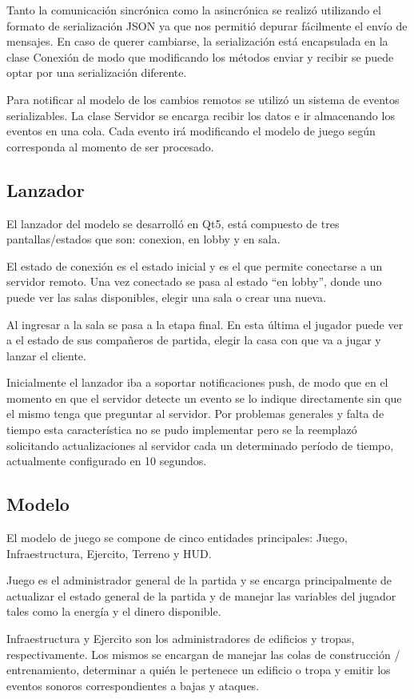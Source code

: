 \documentclass[titlepage,a4paper,12pt]{article}
\begin{document}
Tanto la comunicación sincrónica como la asincrónica se realizó utilizando el formato de serialización JSON ya que nos permitió depurar fácilmente el envío de mensajes. En caso de querer cambiarse, la serialización está encapsulada en la clase Conexión de modo que modificando los métodos enviar y recibir se puede optar por una serialización diferente.

Para notificar al modelo de los cambios remotos se utilizó un sistema de eventos serializables. La clase Servidor se encarga recibir los datos e ir almacenando los eventos en una cola. Cada evento irá modificando el modelo de juego según corresponda al momento de ser procesado.

\subsection{Lanzador}
El lanzador del modelo se desarrolló en Qt5, está compuesto de tres pantallas/estados que son: conexion, en lobby y en sala. 

El estado de conexión es el estado inicial y es el que permite conectarse a un servidor remoto. Una vez conectado se pasa al estado ``en lobby'', donde uno puede ver las salas disponibles, elegir una sala o crear una nueva.

Al ingresar a la sala se pasa a la etapa final. En esta última el jugador puede ver a el estado de sus compañeros de partida, elegir la casa con que va a jugar y lanzar el cliente.

Inicialmente el lanzador iba a soportar notificaciones push, de modo que en el momento en que el servidor detecte un evento se lo indique directamente sin que el mismo tenga que preguntar al servidor. Por problemas generales y falta de tiempo esta característica no se pudo implementar pero se la reemplazó solicitando actualizaciones al servidor cada un determinado período de tiempo, actualmente configurado en 10 segundos.

\subsection{Modelo}
El modelo de juego se compone de cinco entidades principales: Juego, Infraestructura, Ejercito, Terreno y HUD. 

Juego es el administrador general de la partida y se encarga principalmente de actualizar el estado general de la partida y de manejar las variables del jugador tales como la energía y el dinero disponible.

Infraestructura y Ejercito son los administradores de edificios y tropas, respectivamente. Los mismos se encargan de manejar las colas de construcción / entrenamiento, determinar a quién le pertenece un edificio o tropa y emitir los eventos sonoros correspondientes a bajas y ataques.
\end{document}
